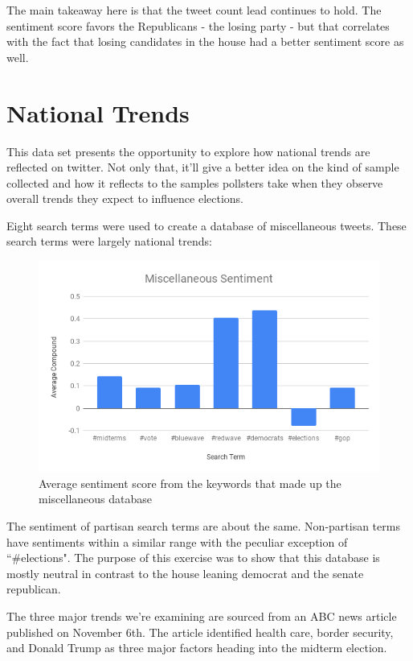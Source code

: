 \documentclass[11pt, twoside, reqno]{book}
\begin{document}
The main takeaway here is that the tweet count lead continues to hold. The sentiment score favors the Republicans - the losing party - but that correlates with the fact that losing candidates in the house had a better sentiment score as well. 

\section{National Trends}
\hspace{0.2in} This data set presents the opportunity to explore how national trends are reflected on twitter. Not only that, it'll give a better idea on the kind of sample collected and how it reflects to the samples pollsters take when they observe overall trends they expect to influence elections. 

Eight search terms were used to create a database of miscellaneous tweets. These search terms were largely national trends:

\begin{figure}[H]
	\centering
	\includegraphics[scale=0.5]{misc_sent}
	\caption{Average sentiment score from the keywords that made up the miscellaneous database}\label{fig:miscc_sent}
\end{figure}

The sentiment of partisan search terms are about the same. Non-partisan terms have sentiments within a similar range with the peculiar exception of ``\#elections". The purpose of this exercise was to show that this database is mostly neutral in contrast to the house leaning democrat and the senate republican. 

The three major trends we're examining are sourced from an ABC news article published on November 6th. The article identified health care, border security, and Donald Trump as three major factors heading into the midterm election\cite{abc_news_2018}.
\end{document}
